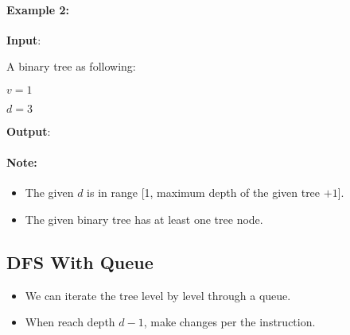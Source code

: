 %
\paragraph{Example 2:}

\begin{flushleft}

\textbf{Input}:
 
A binary tree as following:

\begin{figure}[H]
\end{figure}

$v = 1$

$d = 3$

\textbf{Output}:

\begin{figure}[H]
\end{figure}

\end{flushleft}

\paragraph{Note:}

\begin{itemize}
\item The given $d$ is in range [1, maximum depth of the given tree $+ 1$].
\item The given binary tree has at least one tree node.
\end{itemize}

\subsection{DFS With Queue}
\begin{itemize}
\item We can iterate the tree level by level through a queue.
\item When reach depth $d-1$, make changes per the instruction.
\end{itemize}

